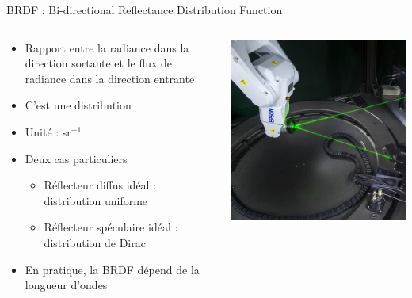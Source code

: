 \begin{frame}{BRDF : Bi-directional Reflectance Distribution Function}
    \begin{columns}
        \begin{column}{0.6\textwidth}
            \begin{itemize}
                \item Rapport entre la radiance dans la direction sortante et le flux de radiance dans la direction entrante 
                \item C'est une distribution 
                \item Unité : sr$^{-1}$
                \item Deux cas particuliers 
                \begin{itemize}
                    \item Réflecteur diffus idéal : distribution uniforme
                    \item Réflecteur spéculaire idéal : distribution de Dirac
                \end{itemize}
                \item En pratique, la BRDF dépend de la longueur d'ondes
            \end{itemize}                 
        \end{column}
        \begin{column}{.39\textwidth}
            \begin{center}
                \includegraphics[width=\columnwidth]{figs/BiRT.png}
            \end{center}
        \end{column}
    \end{columns}
 \end{frame}

